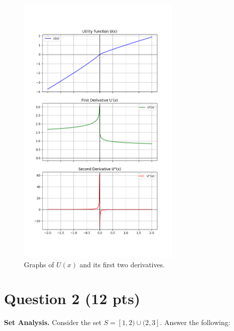 \documentclass[12pt]{article}
\begin{document}
\begin{figure}[htbp]
    \centering
    \includegraphics[width=0.7\textwidth]{q1.png}
    \caption{Graphs of \(U(x)\) and its first two derivatives.}
    \label{fig:my_label}
\end{figure}

\newpage

\section*{Question 2 (12 pts)}
\textbf{Set Analysis.} Consider the set \(S = [1, 2) \cup (2, 3]\). Answer the following:
\end{document}
